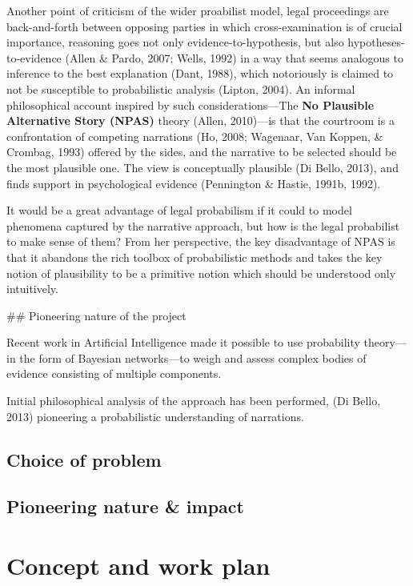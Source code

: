\documentclass[11pt,dvipsnames,enabledeprecatedfontcommands]{scrartcl}
\begin{document}
Another point of criticism of the wider proabilist model, legal
proceedings are back-and-forth between opposing parties in which
cross-examination is of crucial importance, reasoning goes not only
evidence-to-hypothesis, but also hypotheses-to-evidence (Allen \& Pardo,
2007; Wells, 1992) in a way that seems analogous to inference to the
best explanation (Dant, 1988), which notoriously is claimed to not be
susceptible to probabilistic analysis (Lipton, 2004). An informal
philosophical account inspired by such considerations---The
\textbf{No Plausible Alternative Story (NPAS)} theory (Allen, 2010)---is
that the courtroom is a confrontation of competing narrations (Ho, 2008;
Wagenaar, Van Koppen, \& Crombag, 1993) offered by the sides, and the
narrative to be selected should be the most plausible one. The view is
conceptually plausible (Di Bello, 2013), and finds support in
psychological evidence (Pennington \& Hastie, 1991b, 1992).

It would be a great advantage of legal probabilism if it could to model
phenomena captured by the narrative approach, but how is the legal
probabilist to make sense of them? From her perspective, the key
disadvantage of NPAS is that it abandons the rich toolbox of
probabilistic methods and takes the key notion of plausibility to be a
primitive notion which should be understood only intuitively.

\#\# Pioneering nature of the project

Recent work in Artificial Intelligence made it possible to use
probability theory---in the form of Bayesian networks---to weigh and
assess complex bodies of evidence consisting of multiple components.

Initial philosophical analysis of the approach has been performed, (Di
Bello, 2013) pioneering a probabilistic understanding of narrations.


\subsection{Choice of problem}\label{choice-of-problem}

\subsection{Pioneering nature \& impact}\label{pioneering-nature-impact}

\section{Concept and work plan}\label{concept-and-work-plan}
\end{document}
